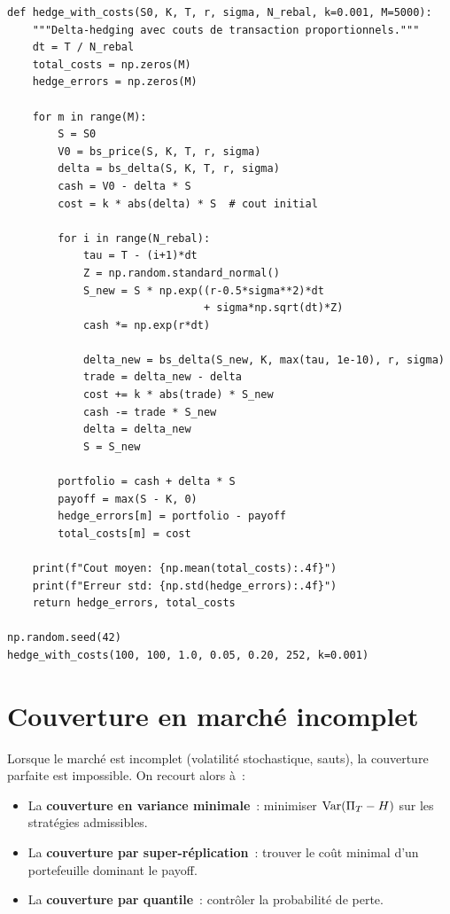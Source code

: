 \begin{codeblock}[title=\textbf{Couverture avec co\^uts de transaction}]
\begin{verbatim}
def hedge_with_costs(S0, K, T, r, sigma, N_rebal, k=0.001, M=5000):
    """Delta-hedging avec couts de transaction proportionnels."""
    dt = T / N_rebal
    total_costs = np.zeros(M)
    hedge_errors = np.zeros(M)

    for m in range(M):
        S = S0
        V0 = bs_price(S, K, T, r, sigma)
        delta = bs_delta(S, K, T, r, sigma)
        cash = V0 - delta * S
        cost = k * abs(delta) * S  # cout initial

        for i in range(N_rebal):
            tau = T - (i+1)*dt
            Z = np.random.standard_normal()
            S_new = S * np.exp((r-0.5*sigma**2)*dt
                               + sigma*np.sqrt(dt)*Z)
            cash *= np.exp(r*dt)

            delta_new = bs_delta(S_new, K, max(tau, 1e-10), r, sigma)
            trade = delta_new - delta
            cost += k * abs(trade) * S_new
            cash -= trade * S_new
            delta = delta_new
            S = S_new

        portfolio = cash + delta * S
        payoff = max(S - K, 0)
        hedge_errors[m] = portfolio - payoff
        total_costs[m] = cost

    print(f"Cout moyen: {np.mean(total_costs):.4f}")
    print(f"Erreur std: {np.std(hedge_errors):.4f}")
    return hedge_errors, total_costs

np.random.seed(42)
hedge_with_costs(100, 100, 1.0, 0.05, 0.20, 252, k=0.001)
\end{verbatim}
\end{codeblock}

\section{Couverture en march\'e incomplet}

\begin{remarque}
Lorsque le march\'e est incomplet (volatilit\'e stochastique, sauts),
la couverture parfaite est impossible. On recourt alors \`a~:
\begin{itemize}
    \item La \textbf{couverture en variance minimale}~: minimiser
          $\mathrm{Var}(\Pi_T - H)$ sur les strat\'egies admissibles.
    \item La \textbf{couverture par super-r\'eplication}~: trouver le
          co\^ut minimal d'un portefeuille dominant le payoff.
    \item La \textbf{couverture par quantile}~: contr\^oler la probabilit\'e
          de perte.
\end{itemize}
\end{remarque}

